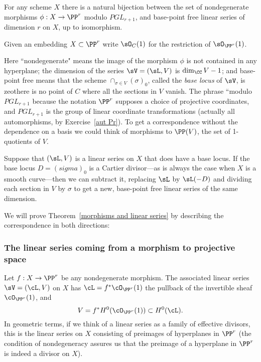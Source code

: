 \begin{theorem}\label{morphisms and linear series}
For any scheme $X$ there is a natural bijection between the set of nondegenerate morphisms $\phi : X \to \PP^r$ modulo $PGL_{r+1}$, and base-point free linear series of dimension $r$ on $X$, up to isomorphism.
\end{theorem}

Given an embedding $X\subset \PP^r$ write $\sO_C(1)$ for the restriction of $\sO_{\PP^r}(1)$.

Here ``nondegenerate" means the image of the morphism $\phi$ is not contained in any hyperplane; the dimension of the series
 $\sV  = (\sL, V)$ is $\dim_\CC V -1$; and base-point free means that the scheme $\cap_{\sigma\in V}(\sigma)_0$, called the  \emph{base locus} of $\sV$, is zeothere is no point of $C$ where all the sections in $V$
vanish. The phrase ``modulo $PGL_{r+1}$ because the notation $\PP^r$ supposes a choice of projective coordinates, and
$PGL_{r+1}$ is the group of linear coordinate transformations (actually all automorphisms, by Exercise~\ref{aut Pr}).
To get a correspondence without the dependence on a basis we could think of morphisms to $\PP(V)$, the set of 1-quotients of $V$.

Suppose that $(\sL, V)$ is a linear series on $X$ that does have a base locus. If the base locus $D = (sigma)_0$ is a Cartier divisor---as is always the
case when $X$ is a smooth curve---then we can subtract it, replacing $\sL$ by $\sL(-D)$ and dividing each section in $V$
by $\sigma$ to get a new, base-point free linear series of the same dimension. 

We will prove Theorem~\ref{morphisms and linear series} by describing the correspondence in both directions:

\subsubsection{The linear series coming from a morphism to projective space}\label{series from morphism}

Let $f : X \to \PP^r$ be any nondegenerate morphism. The associated linear series $\sV = (\cL, V)$ on $X$ has $\cL = f^*\cO_{\PP^r}(1)$ the pullback of the invertible sheaf $\cO_{\PP^r}(1)$, and 
$$
V = f^*H^0(\cO_{\PP^r}(1)) \subset H^0(\cL).
$$
In geometric terms, if we think of a linear series as a family of effective divisors, this is the linear series on $X$ consisting of preimages of hyperplanes in $\PP^r$ (the condition of nondegeneracy assures us that the preimage of a hyperplane in $\PP^r$ is indeed a divisor on $X$).


